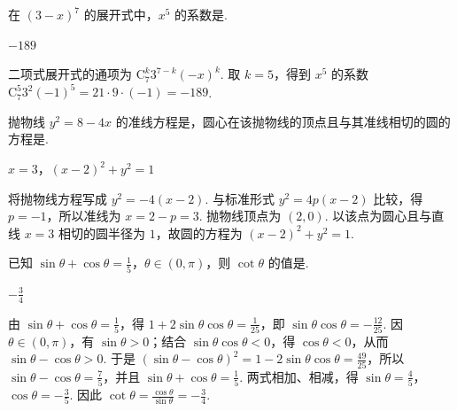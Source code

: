 \documentclass[UTF8,a4paper,oneside,11pt]{ctexbook}
\begin{document}
\begin{problem}
在 \((3 - x)^7\) 的展开式中，\(x^5\) 的系数是\fillinblank{}.
\end{problem}

\begin{answer}
\(-189\)
\end{answer}

\begin{solution}
二项式展开式的通项为 \(\mathrm C_{7}^{k}3^{7-k}(-x)^k\). 取 \(k=5\)，得到 \(x^5\) 的系数 \(\mathrm C_{7}^{5}3^2(-1)^5=21\cdot9\cdot(-1)=-189\).
\end{solution}

\begin{problem}
抛物线 \(y^{2} = 8 - 4x \) 的准线方程是\fillinblank{}，圆心在该抛物线的顶点且与其准线相切的圆的方程是\fillinblank{}.
\end{problem}

\begin{answer}
\(x=3\)，\(\left(x-2\right)^2+y^2=1\)
\end{answer}

\begin{solution}
将抛物线方程写成 \(y^2=-4(x-2)\). 与标准形式 \(y^2=4p(x-2)\) 比较，得 \(p=-1\)，所以准线为 \(x=2-p=3\). 抛物线顶点为 \((2,0)\). 以该点为圆心且与直线 \(x=3\) 相切的圆半径为 \(1\)，故圆的方程为 \((x-2)^2+y^2=1\).
\end{solution}

\begin{problem}
已知 \(\sin \theta + \cos \theta = \frac{1}{5}\)，\(\theta \in (0, \pi)\)，则 \(\cot \theta\) 的值是\fillinblank{}.
\end{problem}

\begin{answer}
\(-\frac{3}{4}\)
\end{answer}

\begin{solution}
由 \(\sin\theta+\cos\theta=\frac{1}{5}\)，得 \(1+2\sin\theta\cos\theta=\frac{1}{25}\)，即 \(\sin\theta\cos\theta=-\frac{12}{25}\). 因 \(\theta\in(0,\pi)\)，有 \(\sin\theta>0\)；结合 \(\sin\theta\cos\theta<0\)，得 \(\cos\theta<0\)，从而 \(\sin\theta-\cos\theta>0\). 于是 \((\sin\theta-\cos\theta)^2=1-2\sin\theta\cos\theta=\frac{49}{25}\)，所以 \(\sin\theta-\cos\theta=\frac{7}{5}\)，并且 \(\sin\theta+\cos\theta=\frac15\).
两式相加、相减，得 \(\sin\theta=\frac{4}{5}\)，\(\cos\theta=-\frac{3}{5}\). 因此
\(\cot\theta=\frac{\cos\theta}{\sin\theta}=-\frac34\).
\end{solution}
\end{document}
